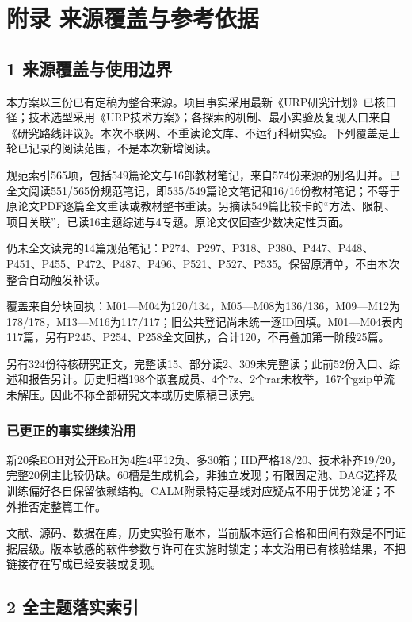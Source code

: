 \documentclass[11pt,a4paper]{article}
\newcommand{\bodytext}[1]{#1\par}
\begin{document}
\section{附录 来源覆盖与参考依据}
\subsection{1  来源覆盖与使用边界}
\bodytext{本方案以三份已有定稿为整合来源。项目事实采用最新《URP研究计划》已核口径；技术选型采用《URP技术方案》；各探索的机制、最小实验及复现入口来自《研究路线评议》。本次不联网、不重读论文库、不运行科研实验。下列覆盖是上轮已记录的阅读范围，不是本次新增阅读。}
\bodytext{规范索引565项，包括549篇论文与16部教材笔记，来自574份来源的别名归并。已全文阅读551/\allowbreak{}565份规范笔记，即535/\allowbreak{}549篇论文笔记和16/\allowbreak{}16份教材笔记；不等于原论文PDF逐篇全文重读或教材整书重读。另摘读549篇比较卡的“方法、限制、项目关联”，已读16主题综述与4专题。原论文仅回查少数决定性页面。}
\bodytext{仍未全文读完的14篇规范笔记：P274、P297、P318、P380、P447、P448、P451、P455、P472、P487、P496、P521、P527、P535。保留原清单，不由本次整合自动触发补读。}
\bodytext{覆盖来自分块回执：M01—M04为120/\allowbreak{}134，M05—M08为136/\allowbreak{}136，M09—M12为178/\allowbreak{}178，M13—M16为117/\allowbreak{}117；旧公共登记尚未统一逐ID回填。M01—M04表内117篇，另有P245、P254、P258全文回执，合计120，不再叠加第一阶段25篇。}
\bodytext{另有324份待核研究正文，完整读15、部分读2、309未完整读；此前52份入口、综述和报告另计。历史归档198个嵌套成员、4个7z、2个rar未枚举，167个gzip单流未解压。因此不称全部研究文本或历史原稿已读完。}
\subsubsection{已更正的事实继续沿用}
\bodytext{新20条EOH对公开EoH为4胜4平12负、多30箱；IID严格18/\allowbreak{}20、技术补齐19/\allowbreak{}20，完整20例主比较仍缺。60槽是生成机会，非独立发现；有限固定池、DAG选择及训练偏好各自保留依赖结构。CALM附录特定基线对应疑点不用于优势论证；不外推否定整篇工作。}
\bodytext{文献、源码、数据在库，历史实验有账本，当前版本运行合格和田间有效是不同证据层级。版本敏感的软件参数与许可在实施时锁定；本文沿用已有核验结果，不把链接存在写成已经安装或复现。}
\subsection{2  全主题落实索引}
\end{document}
